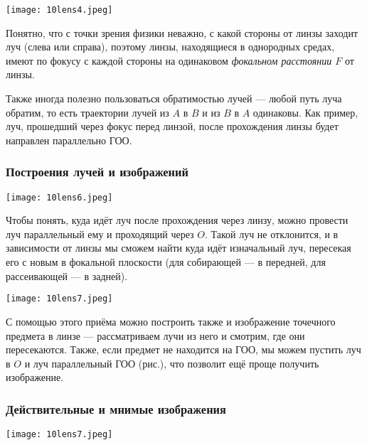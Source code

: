 \documentclass[12pt, a4paper]{article}%
\begin{document}
\begin{center}
\texttt{[image: 10lens4.jpeg]}
\label{fig:mpr}
\end{center}

Понятно, что с точки зрения физики неважно, с какой стороны от линзы заходит луч (слева или справа), поэтому линзы, находящиеся в однородных средах, имеют по фокусу с каждой стороны на одинаковом \textit{фокальном расстоянии $F$} от линзы.

Также иногда полезно пользоваться обратимостью лучей --- любой путь луча обратим, то есть траектории лучей из $A$ в $B$ и из $B$ в $A$ одинаковы. Как пример, луч, прошедший через фокус перед линзой, после прохождения линзы будет направлен параллельно ГОО.



\subsubsection*{Построения лучей и изображений}
\begin{center}
\texttt{[image: 10lens6.jpeg]}
\label{fig:mpr}
\end{center}

Чтобы понять, куда идёт луч после прохождения через линзу, можно провести луч параллельный ему и проходящий через $O$. Такой луч не отклонится, и в зависимости от линзы мы сможем найти куда идёт изначальный луч, пересекая его с новым в фокальной плоскости (для собирающей --- в передней, для рассеивающей --- в задней).

\begin{center}
\texttt{[image: 10lens7.jpeg]}
\label{fig:mpr}
\end{center}

С помощью этого приёма можно построить также и изображение точечного предмета в линзе --- рассматриваем лучи из него и смотрим, где они пересекаются. Также, если предмет не находится на ГОО, мы можем пустить луч в $O$ и луч параллельный ГОО (рис.), что позволит ещё проще получить изображение.



\subsubsection*{Действительные и мнимые изображения}

\begin{center}
\texttt{[image: 10lens7.jpeg]}
\label{fig:mpr}
\end{center}
\end{document}
